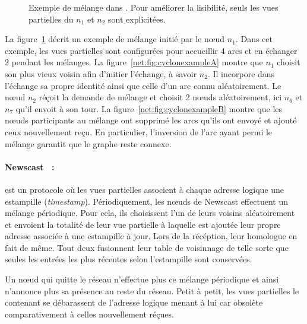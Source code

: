 \begin{figure}
  \centering
  \hspace{35pt}
  \caption{\label{net:fig:cyclonexample} Exemple de mélange dans \CYCLON. Pour
    améliorer la lisibilité, seuls les vues partielles du $n_1$ et $n_2$ sont
    explicitées.}
\end{figure}
  
\noindent La figure~\ref{net:fig:cyclonexample} décrit un exemple de mélange
initié par le nœud $n_1$. Dans cet exemple, les vues partielles sont configurées
pour accueillir 4 arcs et en échanger 2 pendant les mélanges. La
figure~\ref{net:fig:cyclonexampleA} montre que $n_1$ choisit son plus vieux
voisin afin d'initier l'échange, à savoir $n_2$. Il incorpore dans l'échange sa
propre identité ainsi que celle d'un arc connu aléatoirement. Le nœud $n_2$
réçoit la demande de mélange et choisit 2 nœuds aléatoirement, ici $n_6$ et
$n_7$ qu'il envoit à son tour. La figure~\ref{net:fig:cyclonexampleB} montre que
les nœuds participants au mélange ont supprimé les arcs qu'ils ont envoyé et
ajouté ceux nouvellement reçu. En particulier, l'inversion de l'arc ayant permi
le mélange garantit que le graphe reste connexe.

\paragraph{Newscast~\cite{tolgyeski2009adaptive} :} est un protocole où les vues
partielles associent à chaque adresse logique une estampille
(\emph{timestamp}). Périodiquement, les nœuds de Newscast effectuent un mélange
périodique. Pour cela, ils choisissent l'un de leurs voisins aléatoirement et
envoient la totalité de leur vue partielle à laquelle est ajoutée leur propre
adresse associée à une estampille à jour. Lors de la récéption, leur homologue
en fait de même. Tout deux fusionnent leur table de voisinnage de telle sorte
que seules les entrées les plus récentes selon l'estampille sont conservées.

\noindent Un nœud qui quitte le réseau n'effectue plus ce mélange périodique et
ainsi n'annonce plus sa présence au reste du réseau. Petit à petit, les vues
partielles le contenant se débarassent de l'adresse logique menant à lui car
obsolète comparativement à celles nouvellement réçues.

